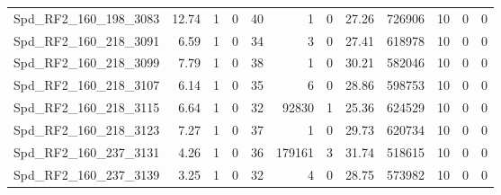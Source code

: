 \begin{longtable}[c]{@{}lrrrrrrrrrrr@{}}
Spd\_RF2\_160\_198\_3083      & 12.74                  & 1                       & 0                       & 40                     & 1                       & 0                       & 27.26                   & 726906                   & 10                       & 0                        & 0                        \\
Spd\_RF2\_160\_218\_3091      & 6.59                   & 1                       & 0                       & 34                     & 3                       & 0                       & 27.41                   & 618978                   & 10                       & 0                        & 0                        \\
Spd\_RF2\_160\_218\_3099      & 7.79                   & 1                       & 0                       & 38                     & 1                       & 0                       & 30.21                   & 582046                   & 10                       & 0                        & 0                        \\
Spd\_RF2\_160\_218\_3107      & 6.14                   & 1                       & 0                       & 35                     & 6                       & 0                       & 28.86                   & 598753                   & 10                       & 0                        & 0                        \\
Spd\_RF2\_160\_218\_3115      & 6.64                   & 1                       & 0                       & 32                     & 92830                   & 1                       & 25.36                   & 624529                   & 10                       & 0                        & 0                        \\
Spd\_RF2\_160\_218\_3123      & 7.27                   & 1                       & 0                       & 37                     & 1                       & 0                       & 29.73                   & 620734                   & 10                       & 0                        & 0                        \\
Spd\_RF2\_160\_237\_3131      & 4.26                   & 1                       & 0                       & 36                     & 179161                  & 3                       & 31.74                   & 518615                   & 10                       & 0                        & 0                        \\
Spd\_RF2\_160\_237\_3139      & 3.25                   & 1                       & 0                       & 32                     & 4                       & 0                       & 28.75                   & 573982                   & 10                       & 0                        & 0                        \\

\end{longtable}
